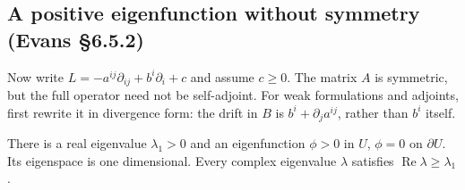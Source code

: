 \Needspace{35mm}
\subsection{A positive eigenfunction without symmetry (Evans \S6.5.2)}
Now write $L=-a^{ij}\partial_{ij}+b^i\partial_i+c$ and assume $c\geq0$.
The matrix $A$ is symmetric, but the full operator need not be self-adjoint.
For weak formulations and adjoints, first rewrite it in divergence form:
the drift in $B$ is $b^i+\partial_j a^{ij}$, rather than $b^i$ itself.

\begin{theorem}\label{thm:6-principal-nonsym}
There is a real eigenvalue $\lambda_1>0$ and an eigenfunction
$\phi>0$ in $U$, $\phi=0$ on $\partial U$.
Its eigenspace is one dimensional. Every complex eigenvalue $\lambda$
satisfies $\operatorname{Re}\lambda\geq\lambda_1$.
\end{theorem}
\Needspace{45mm}
